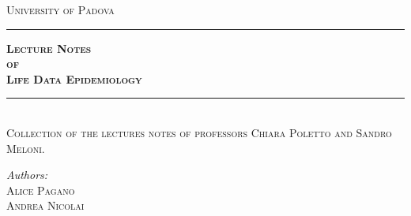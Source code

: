 \begin{titlepage} %
	\newcommand{\HRule}{\rule{\linewidth}{0.5mm}} %
	
	\center %
	
	
	\textsc{\LARGE University of Padova}\vspace{1.5cm} %
	

	
	\HRule \vspace{0.5cm}
	
	\textsc{\LARGE \bfseries Lecture Notes \\ of\\ Life Data Epidemiology \\}\vspace{0.5cm} %
	
	\HRule\\[0.5cm]

	\textsc{ \small Collection of the lectures notes of professors Chiara Poletto and Sandro Meloni.}\vspace{0.5cm} %
	
	\vspace{1.5cm}
	
			\large
			\textit{Authors:}\\
			\textsc{Alice Pagano} \\ 
			\textsc{Andrea Nicolai} %
	

\end{titlepage}
